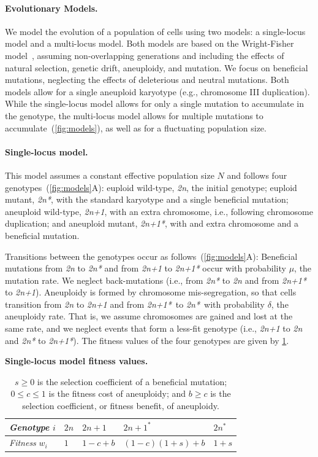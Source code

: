 \documentclass[12pt]{extarticle}
\newcommand{\euwt}{\emph{2n}}
\newcommand{\anwt}{\emph{2n+1}}
\newcommand{\eumt}{\emph{2n*}}
\newcommand{\anmt}{\emph{2n+1*}}
\begin{document}
\paragraph*{Evolutionary Models.}
We model the evolution of a population of cells using two models: a single-locus model and a multi-locus model.
Both models are based on the Wright-Fisher model~\citep{Otto2007}, assuming non-overlapping generations and including the effects of natural selection, genetic drift, aneuploidy, and mutation. 
We focus on beneficial mutations, neglecting the effects of deleterious and neutral mutations. Both models allow for a single aneuploid karyotype (e.g., chromosome III duplication).
While the single-locus model allows for only a single mutation to accumulate in the genotype, the multi-locus model allows for multiple mutations to accumulate~(\cref{fig:models}), as well as for a fluctuating population size.

\paragraph*{Single-locus model.}
This model assumes a constant effective population size $N$ and follows four genotypes~(\cref{fig:models}A): euploid wild-type, \euwt, the initial genotype; 
euploid mutant, \eumt, with the standard karyotype and a single beneficial mutation; 
aneuploid wild-type, \anwt, with an extra chromosome, i.e., following chromosome duplication; and
aneuploid mutant, \anmt, with and extra chromosome and a beneficial mutation. 

Transitions between the genotypes occur as follows~(\cref{fig:models}A): Beneficial mutations from \euwt\; to \eumt\; and from \anwt\; to \anmt\; occur with probability $\mu$, the mutation rate. We neglect back-mutations (i.e., from \eumt\; to \euwt\; and from \anmt\; to \anwt).
Aneuploidy is formed by chromosome mis-segregation, so that cells transition from \euwt\; to \anwt\; and from \anmt\ to \eumt\ with probability $\delta$, the aneuploidy rate. That is, we assume chromosomes are gained and lost at the same rate, and we neglect events that form a less-fit genotype (i.e., \anwt\; to \euwt\; and \eumt\; to \anmt).
The fitness values of the four genotypes are given by \cref{table:single-locus}.

\begin{table}[h]
\centering
\caption{\textbf{Single-locus model fitness values.}}
\begin{tabular}{lllll}
\emph{Genotype} $i$ & $2n$ & $2n+1$ & $2n+1^*$ & $2n^*$ \\
\hline
\emph{Fitness} $w_i$ & $1$ & $1-c+b$ & $(1-c)(1+s)+b$ & $1+s$               
\end{tabular}
\label{table:single-locus}
\caption*{
$s \ge 0$ is the selection coefficient of a beneficial mutation;
$0 \le c \le 1$ is the fitness cost of aneuploidy;
and $b \ge c$ is the selection coefficient, or fitness benefit, of aneuploidy.
}
\end{table}
\end{document}
